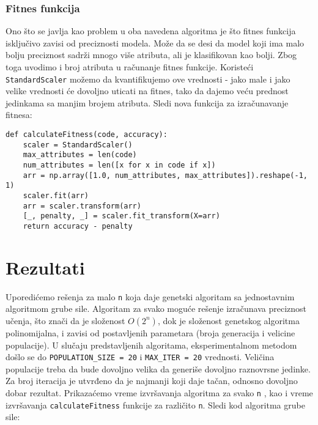 \documentclass[11pt]{article} %
\begin{document}
\subsubsection{Fitnes funkcija}
Ono što se javlja kao problem u oba navedena algoritma je što fitnes funkcija isključivo zavisi od preciznosti modela. Može da se desi da model koji ima malo bolju preciznost sadrži mnogo više atributa, ali je klasifikovan kao bolji. Zbog toga uvodimo i broj atributa u računanje fitnes funkcije. Koristeći \lstinline{StandardScaler} možemo da kvantifikujemo ove vrednosti - jako male i jako velike vrednosti će dovoljno uticati na fitnes, tako da dajemo veću prednost jedinkama sa manjim brojem atributa. Sledi nova funkcija za izračunavanje fitnesa:
\begin{lstlisting}
def calculateFitness(code, accuracy):
    scaler = StandardScaler()
    max_attributes = len(code)
    num_attributes = len([x for x in code if x])
    arr = np.array([1.0, num_attributes, max_attributes]).reshape(-1, 1)
    scaler.fit(arr)
    arr = scaler.transform(arr)
    [_, penalty, _] = scaler.fit_transform(X=arr)
    return accuracy - penalty
\end{lstlisting}

\section{Rezultati}
Uporedićemo rešenja za malo \lstinline{n} koja daje genetski algoritam sa jednostavnim algoritmom grube sile. Algoritam za svako moguće rešenje izračunava preciznost učenja, što znači da je složenost \( O(2^n) \), dok je složenost genetskog algoritma polinomijalna, i zavisi od postavljenih parametara (broja generacija i velicine populacije). U slučaju predstavljenih algoritama, eksperimentalnom metodom došlo se do \lstinline{POPULATION_SIZE = 20} i \lstinline{MAX_ITER = 20} vrednosti. Veličina populacije treba da bude dovoljno velika da generiše dovoljno raznovrsne jedinke. Za broj iteracija je utvrđeno da je najmanji koji daje tačan, odnosno dovoljno dobar rezultat. Prikazaćemo vreme izvršavanja algoritma za svako \lstinline{n} , kao i vreme izvršavanja \lstinline{calculateFitness} funkcije za različito \lstinline{n}.
\newline Sledi kod algoritma grube sile:
\end{document}
